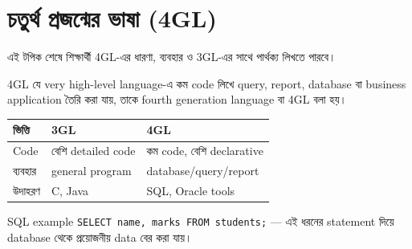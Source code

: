 \section{চতুর্থ প্রজন্মের ভাষা (4GL)}

\begin{learningbox}
এই টপিক শেষে শিক্ষার্থী 4GL-এর ধারণা, ব্যবহার ও 3GL-এর সাথে পার্থক্য লিখতে পারবে।
\end{learningbox}

\begin{definitionbox}{4GL}
যে very high-level language-এ কম code লিখে query, report, database বা business application তৈরি করা যায়, তাকে fourth generation language বা 4GL বলা হয়।
\end{definitionbox}

\begin{center}
\begin{tabular}{|p{}|p{}|p{}|}
\hline
\textbf{ভিত্তি} & \textbf{3GL} & \textbf{4GL} \\
\hline
Code & বেশি detailed code & কম code, বেশি declarative \\
\hline
ব্যবহার & general program & database/query/report \\
\hline
উদাহরণ & C, Java & SQL, Oracle tools \\
\hline
\end{tabular}
\end{center}

\begin{examplebox}{SQL example}
\texttt{SELECT name, marks FROM students;} — এই ধরনের statement দিয়ে database থেকে প্রয়োজনীয় data বের করা যায়।
\end{examplebox}
